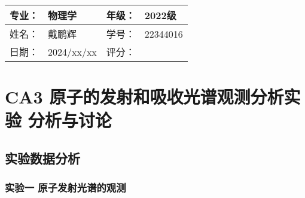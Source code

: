 \documentclass[dvipsnames, svgnames,a4paper,11pt]{article}
\begin{document}
\clearpage
\begin{table}
	\renewcommand\arraystretch{1.7}
	\begin{tabularx}{\textwidth}{|X|X|X|X|}
	\hline
	专业：& 物理学 &年级：& 2022级\\
	\hline
	姓名： & 戴鹏辉 & 学号：& 22344016\\
	\hline
    日期：& 2024/xx/xx & 评分： &\\
	\hline
	\end{tabularx}
\end{table}

\section{CA3 \quad 原子的发射和吸收光谱观测分析实验 \quad\heiti 分析与讨论}

\subsection{实验数据分析}

	\subsubsection{实验一 \quad 原子发射光谱的观测}
		
\end{document}
